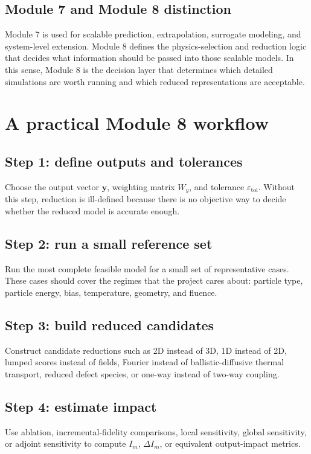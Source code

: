 \documentclass[11pt]{article}
\begin{document}
\subsection{Module 7 and Module 8 distinction}
Module 7 is used for scalable prediction, extrapolation, surrogate modeling, and system-level extension. Module 8 defines the physics-selection and reduction logic that decides what information should be passed into those scalable models. In this sense, Module 8 is the decision layer that determines which detailed simulations are worth running and which reduced representations are acceptable.

\section{A practical Module 8 workflow}
\subsection{Step 1: define outputs and tolerances}
Choose the output vector \(\bm{y}\), weighting matrix \(W_y\), and tolerance \(\varepsilon_{\mathrm{tol}}\). Without this step, reduction is ill-defined because there is no objective way to decide whether the reduced model is accurate enough.

\subsection{Step 2: run a small reference set}
Run the most complete feasible model for a small set of representative cases. These cases should cover the regimes that the project cares about: particle type, particle energy, bias, temperature, geometry, and fluence.

\subsection{Step 3: build reduced candidates}
Construct candidate reductions such as 2D instead of 3D, 1D instead of 2D, lumped scores instead of fields, Fourier instead of ballistic-diffusive thermal transport, reduced defect species, or one-way instead of two-way coupling.

\subsection{Step 4: estimate impact}
Use ablation, incremental-fidelity comparisons, local sensitivity, global sensitivity, or adjoint sensitivity to compute \(I_m\), \(\Delta I_m\), or equivalent output-impact metrics.
\end{document}
